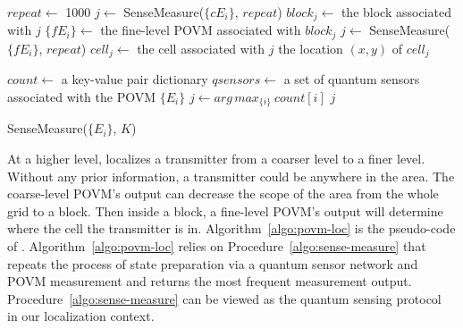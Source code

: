 \begin{algorithm}[ht] 
        $repeat \leftarrow$ 1000 \;	
        $j \leftarrow$ SenseMeasure($\{cE_i\}$, $repeat$) \;
        $block_j \leftarrow$ the block associated with $j$ \;
        $\{ fE_i\} \leftarrow$ the fine-level POVM associated with $block_j$ \;
        $j \leftarrow$ SenseMeasure($\{fE_i\}$, $repeat$) \;
        $cell_j \leftarrow$ the cell associated with $j$ \;
        \Return the location $(x, y)$ of $cell_j$ \;
	\caption{\povm}
\label{algo:povm-loc}
\end{algorithm}
\begin{procedure}[ht]
    $count \leftarrow$ a key-value pair dictionary\;
    $qsensors \leftarrow$ a set of quantum sensors associated with the POVM $\{E_i\}$ \;
    $j \leftarrow arg\,max_{\{ i\}} \ count[i]$ \;
    \Return $j$ \;
    \caption{SenseMeasure($\{E_i\}$, $K$)}
\label{algo:sense-measure}
\end{procedure}
At a higher level, \povm localizes a transmitter from a coarser level to a finer level.
Without any prior information, a transmitter could be anywhere in the area.
The coarse-level POVM's output can decrease the scope of the area from the whole grid to a block.
Then inside a block, a fine-level POVM's output will determine where the cell the transmitter is in.
Algorithm~\ref{algo:povm-loc} is the pseudo-code of \povm.
Algorithm~\ref{algo:povm-loc} relies on Procedure~\ref{algo:sense-measure} that repeats the process of state preparation via a quantum sensor network and POVM measurement and returns the most frequent measurement output. 
Procedure~\ref{algo:sense-measure} can be viewed as the quantum sensing protocol~\cite{RevModPhys.quantumsensing} in our localization context.


